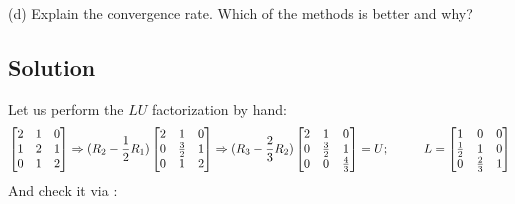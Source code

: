 \documentclass[letterpaper,10pt,english]{jupyterBook}
\begin{document}
\sphinxAtStartPar
(d) Explain the convergence rate. Which of the methods is better and why?


\subsection{Solution}
\label{\detokenize{notebooks/ProblemSet2:solution}}
\sphinxAtStartPar
Let us perform the \(LU\) factorization by hand:
\begin{equation*}
\begin{split}
\begin{align*}
\begin{bmatrix}
2 & 1 & 0\\
1 & 2 & 1\\
0 & 1 & 2
\end{bmatrix}
\Rightarrow (R_2 - \frac{1}{2}R_1)
\begin{bmatrix}
2 & 1 & 0\\
0 & \frac{3}{2} & 1\\
0 & 1 & 2
\end{bmatrix}
\Rightarrow (R_3 - \frac{2}{3}R_2)
\begin{bmatrix}
2 & 1 & 0\\
0 & \frac{3}{2} & 1\\
0 & 0 & \frac{4}{3}
\end{bmatrix}
= U;
\hspace{10mm}
L =
\begin{bmatrix}
1 & 0 & 0\\
\frac{1}{2} & 1 & 0\\
0 & \frac{2}{3} & 1
\end{bmatrix}
\end{align*}
\end{split}
\end{equation*}
\sphinxAtStartPar
And check it via :
\end{document}
